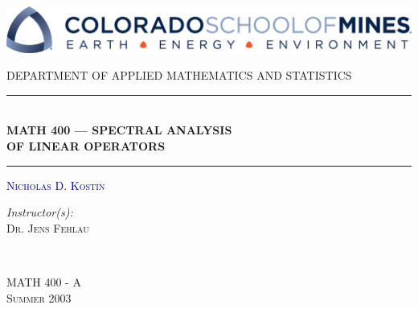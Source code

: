 \documentclass[class=report,crop=false]{standalone}
\begin{document}
\begin{titlepage}

\centering

\includegraphics[width=\textwidth]{images/mines.png}

\vspace{1cm}

\textsc{\large {DEPARTMENT OF APPLIED MATHEMATICS AND STATISTICS}}

\vspace{0.5cm}

\rule{\textwidth}{1pt}\\[0.1cm]
{\huge {\textbf{MATH 400 --- SPECTRAL ANALYSIS \\[0.1cm] OF LINEAR OPERATORS}}}\\[0.1cm]
\rule{\textwidth}{1pt}


\vspace{1cm}

\textsc{\huge \textcolor{DARKBLUE}{\textsc{Nicholas D. Kostin}}}

\vspace{1.4cm}

\begin{minipage}{0.4\textwidth}
\begin{flushleft} \large
\emph{Instructor(s):} \\
\textsc{Dr. Jens Fehlau} \\
\end{flushleft}
\end{minipage}
~
\begin{minipage}{0.4\textwidth}
\begin{flushright} \large
\textsc{MATH 400 - A} \\
\textsc{Summer 2003}
\end{flushright}
\end{minipage}\\[6cm]

\vfill

\end{titlepage}
\end{document}
